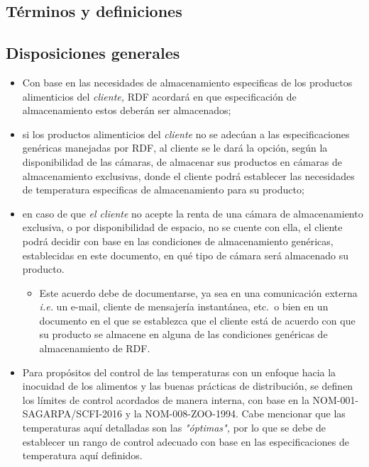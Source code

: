 \subsection{Términos y definiciones}

\begin{description}
\end{description}

\subsection{Disposiciones generales}

\begin{itemize}
	\item Con base en las necesidades de almacenamiento especificas de los productos alimenticios del \emph{cliente,} \gls{RDF} acordará en que especificación de almacenamiento estos deberán ser almacenados;
	\item si los productos alimenticios del \emph{cliente} no se adecúan a las especificaciones genéricas manejadas por \gls{RDF}, al cliente se le dará la opción, según la disponibilidad de las cámaras, de almacenar sus productos en cámaras de almacenamiento exclusivas, donde el cliente podrá establecer las necesidades de temperatura especificas de almacenamiento para su producto;
	\item en caso de que \emph{el cliente} no acepte la renta de una cámara de almacenamiento exclusiva, o por disponibilidad de espacio, no se cuente con ella, el cliente podrá decidir con base en las condiciones de almacenamiento genéricas, establecidas en este documento, en qué tipo de cámara será almacenado su producto.
	\begin{itemize}
		\item Este acuerdo debe de documentarse, ya sea en una comunicación externa \emph{i.e.} un e-mail, cliente de mensajería instantánea, etc.\ o bien en un documento en el que se establezca que el cliente está de acuerdo con que su producto se almacene en alguna de las condiciones genéricas de almacenamiento de \gls{RDF}.
	\end{itemize}
	\item Para propósitos del control de las temperaturas con un enfoque hacia la inocuidad de los alimentos y las buenas prácticas de distribución, se definen los límites de control acordados de manera interna, con base en la NOM-001-SAGARPA/SCFI-2016 y la NOM-008-ZOO-1994. Cabe mencionar que las temperaturas aquí detalladas son las \emph{"óptimas",} por lo que se debe de establecer un rango de control adecuado con base en las especificaciones de temperatura aquí definidos.
\end{itemize}

